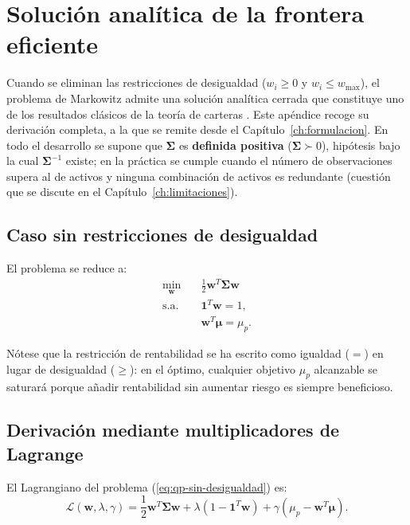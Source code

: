 \chapter{Solución analítica de la frontera eficiente}
\label{ap:frontera-analitica}

Cuando se eliminan las restricciones de desigualdad ($w_i \ge 0$ y
$w_i \le w_{\max}$), el problema de Markowitz admite una solución analítica
cerrada que constituye uno de los resultados clásicos de la teoría de
carteras \cite{Merton1972}. Este apéndice recoge su derivación completa, a
la que se remite desde el Capítulo~\ref{ch:formulacion}. En todo el desarrollo
se supone que $\boldsymbol{\Sigma}$ es \textbf{definida positiva}
($\boldsymbol{\Sigma} \succ 0$), hipótesis bajo la cual $\boldsymbol{\Sigma}^{-1}$
existe; en la práctica se cumple cuando el número de observaciones supera al de
activos y ninguna combinación de activos es redundante (cuestión que se discute
en el Capítulo~\ref{ch:limitaciones}).

\section{Caso sin restricciones de desigualdad}

El problema se reduce a:
\begin{equation}
    \begin{aligned}
        \min_{\mathbf{w}} \quad & \frac{1}{2} \mathbf{w}^T
            \boldsymbol{\Sigma} \mathbf{w} \\
        \text{s.a.} \quad & \mathbf{1}^T \mathbf{w} = 1, \\
        & \mathbf{w}^T \boldsymbol{\mu} = \mu_p.
    \end{aligned}
    \label{eq:qp-sin-desigualdad}
\end{equation}

Nótese que la restricción de rentabilidad se ha escrito como igualdad
($=$) en lugar de desigualdad ($\ge$): en el óptimo, cualquier objetivo
$\mu_p$ alcanzable se saturará porque añadir rentabilidad sin aumentar
riesgo es siempre beneficioso.

\section{Derivación mediante multiplicadores de Lagrange}

El Lagrangiano del problema (\ref{eq:qp-sin-desigualdad}) es:
\begin{equation}
    \mathcal{L}(\mathbf{w}, \lambda, \gamma)
    = \frac{1}{2} \mathbf{w}^T \boldsymbol{\Sigma} \mathbf{w}
    + \lambda (1 - \mathbf{1}^T \mathbf{w})
    + \gamma (\mu_p - \mathbf{w}^T \boldsymbol{\mu}).
    \label{eq:lagrangiano-sin-desigualdad}
\end{equation}

